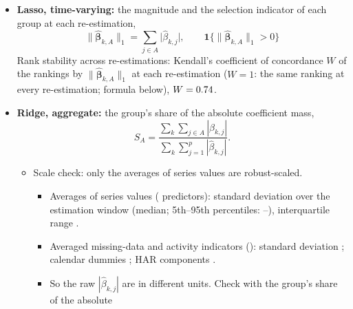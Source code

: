 \begin{itemize}
\begin{itemize}
    of the re-estimations.
  \item Exogenous series: \rhfiLassoExogEver{} of \rhfiNExog{} selected at least once; \rhfiLassoExogMajority{} in at
    least half of the re-estimations; \rhfiLassoExogAlways{} in every re-estimation (\rhfiLassoAlwaysList).
  \item HAR benchmark block: selected in every re-estimation ($\omega_j = \rhfiBackbonePf$);
    \rhfiLassoBackboneShare\,\% of $\sum_j |\hat\beta_{k,j}|$ (median re-estimation).
  \item Random-probe benchmark: the continuous probe, an i.i.d.\ uniform noise predictor (defined under Known issues),
    is selected in \rhfiLassoProbeRate\,\% of its fits; \rhfiLassoColsAboveProbe{} predictors, in
    \rhfiLassoSeriesAboveProbe{} exogenous series, are selected more often.
  \end{itemize}
\item \textbf{Lasso, time-varying:} the magnitude and the selection indicator of each group at each re-estimation,
  \[
    \lVert\hat{\bm\beta}_{k,A}\rVert_1 = \sum_{j \in A} \bigl|\hat\beta_{k,j}\bigr|, \qquad
    \mathbf{1}\bigl\{\lVert\hat{\bm\beta}_{k,A}\rVert_1 > 0\bigr\}
  \]
  Rank stability across re-estimations: Kendall's coefficient of
  concordance $W$ of the rankings by $\lVert\hat{\bm\beta}_{k,A}\rVert_1$ at each re-estimation ($W = 1$: the same
  ranking at every re-estimation; formula below), $W = 0.74$.
\item \textbf{Ridge, aggregate:} the group's share of the absolute coefficient mass,
  \[
    S_A = \frac{\sum_{k} \sum_{j \in A} |\hat\beta_{k,j}|}{\sum_{k} \sum_{j=1}^{p} |\hat\beta_{k,j}|} .
  \]
  \begin{itemize}
  \item Scale check: only the averages of series values are robust-scaled.
    \begin{itemize}
    \item Averages of series values (\rhfiScaleValueN{} predictors): standard deviation over the estimation window
      \rhfiScaleValueSd{} (median; 5th--95th percentiles: \rhfiScaleValueSdLo--\rhfiScaleValueSdHi), interquartile
      range \rhfiScaleValueIqr.
    \item Averaged missing-data and activity indicators (\rhfiScaleFlagN): standard deviation \rhfiScaleFlagSd;
      calendar dummies \rhfiScaleCalSd; HAR components \rhfiScaleHarSd.
    \item So the raw $|\hat\beta_{k,j}|$ are in different units. Check with the group's share of the absolute

\end{itemize}
\end{itemize}
\end{itemize}
